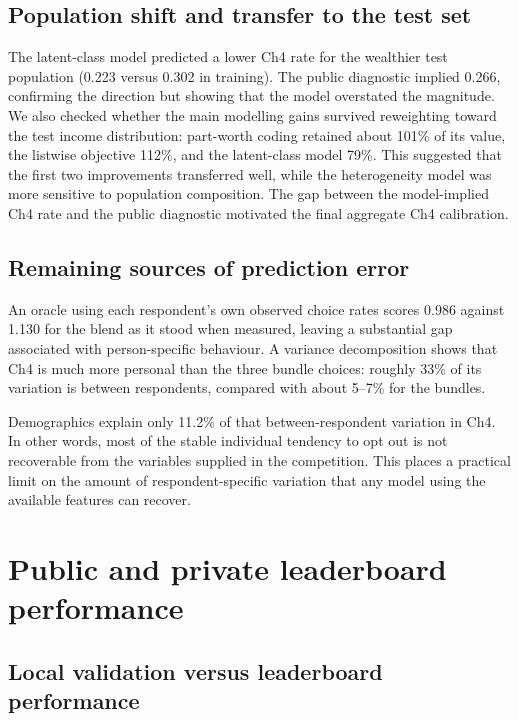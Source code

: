 \documentclass[11pt]{article}
\begin{document}
\subsection{Population shift and transfer to the test set}

The latent-class model predicted a lower Ch4 rate for the wealthier test population
(0.223 versus 0.302 in training). The public diagnostic implied 0.266, confirming the
direction but showing that the model overstated the magnitude. We also checked whether
the main modelling gains survived reweighting toward the test income distribution:
part-worth coding retained about 101\% of its value, the listwise objective 112\%, and
the latent-class model 79\%. This suggested that the first two improvements transferred
well, while the heterogeneity model was more sensitive to population composition. The
gap between the model-implied Ch4 rate and the public diagnostic motivated the final
aggregate Ch4 calibration.

\subsection{Remaining sources of prediction error}

An oracle using each respondent's own observed choice rates scores 0.986 against 1.130 for
the blend as it stood when measured, leaving a substantial gap associated with
person-specific behaviour. A variance decomposition shows that Ch4 is much more personal
than the three bundle choices: roughly 33\% of its variation is between respondents,
compared with about 5--7\% for the bundles.

Demographics explain only 11.2\% of that between-respondent variation in Ch4. In other
words, most of the stable individual tendency to opt out is not recoverable from the
variables supplied in the competition. This places a practical limit on the amount of
respondent-specific variation that any model using the available features can recover.

\section{Public and private leaderboard performance}\label{sec:lb}

\subsection{Local validation versus leaderboard performance}
\end{document}
